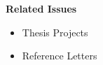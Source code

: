 \begin{frame}
	\textbf{Related Issues}\vspace{0.3cm}

	\begin{itemize}\setlength\itemsep{1em}
	\item Thesis Projects
	\item Reference Letters
	\end{itemize}
\end{frame}
